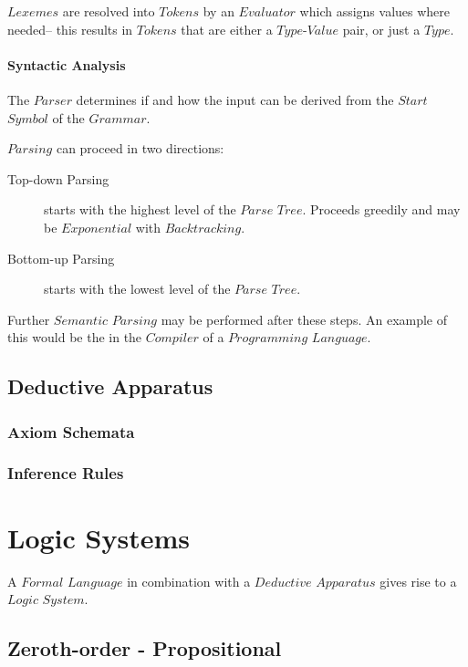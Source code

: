\documentclass{article}
\begin{document}
    $Lexemes$ are resolved into $Tokens$ by an $Evaluator$ which
    assigns values where needed-- this results in $Tokens$ that are
    either a $Type$-$Value$ pair, or just a $Type$.

    \paragraph{Syntactic Analysis}

    The $Parser$ determines if and how the input can be derived from
    the $Start$ $Symbol$ of the $Grammar$.

    $Parsing$ can proceed in two directions:

    \begin{description}
    \item[Top-down Parsing]
    starts with the highest level of the $Parse$ $Tree$. Proceeds
    greedily and may be $Exponential$ with $Backtracking$.
    \item[Bottom-up Parsing]
    starts with the lowest level of the $Parse$ $Tree$.
    \end{description}

    Further $Semantic$ $Parsing$ may be performed after these
    steps. An example of this would be the in the $Compiler$ of a
    $Programming$ $Language$.

\subsection{Deductive Apparatus}

\subsubsection{Axiom Schemata}

\subsubsection{Inference Rules}

\section{Logic Systems}

A $Formal$ $Language$ in combination with a $Deductive$ $Apparatus$
gives rise to a $Logic$ $System$.

\subsection{Zeroth-order - Propositional}
\end{document}
